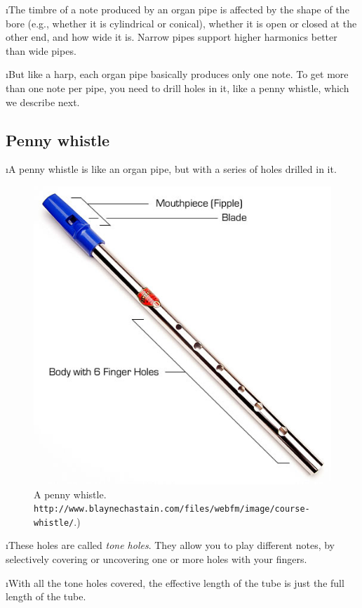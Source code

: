 \i The timbre of a note produced by an organ pipe is 
affected by the shape of the bore (e.g., whether 
it is cylindrical or conical), whether it is open 
or closed at the other end, and how wide it is.
Narrow pipes support higher harmonics better than 
wide pipes.

\i But like a harp, each organ pipe basically 
produces only one note.
To get more than one note per pipe, you need 
to drill holes in it, like a penny whistle, which
we describe next.

\ei
\subsection{Penny whistle}
\bi

\i A penny whistle is like an organ pipe, but with 
a series of holes drilled in it.
%
\begin{figure}[htbp]
\begin{center}
\includegraphics[height=.5\textwidth]{pennywhistle.jpg}
\caption{A penny whistle.
{\tt http://www.blaynechastain.com/files/webfm/image/course-whistle/}.)}
\label{f:pennywhistle}
\end{center}
\end{figure}

\i These holes are called {\em tone holes}.
They allow you to play different notes, by selectively covering
or uncovering one or more holes with your fingers.

\i With all the tone holes covered, the effective length of
the tube is just the full length of the tube.

